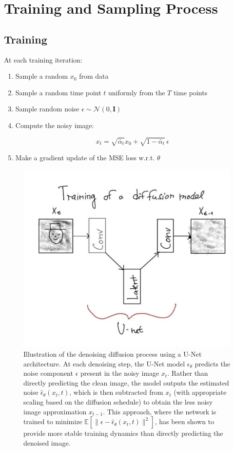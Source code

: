 \section{Training and Sampling Process}


\subsection*{Training}
At each training iteration:
\begin{enumerate}
    \item Sample a random $x_0$ from data
    \item Sample a random time point $t$ uniformly from the $T$ time points
    \item Sample random noise $\epsilon \sim \mathcal{N}(0, \mathbf{I})$
    \item Compute the noisy image:
\begin{definition}    \[
    x_t = \sqrt{\bar{\alpha}_t} x_0 + \sqrt{1 - \bar{\alpha}_t} \, \epsilon
    \]\end{definition}
    \item Make a gradient update of the MSE loss w.r.t. $\theta$
\end{enumerate}
\begin{figure}[H]
    \centering
    \includegraphics[width=1\linewidth]{billede.png}
    \caption{Illustration of the denoising diffusion process using a U-Net architecture. At each denoising step, the U-Net model $\epsilon_\theta$ predicts the noise component $\epsilon$ present in the noisy image $x_t$. Rather than directly predicting the clean image, the model outputs the estimated noise $\hat{\epsilon}_\theta(x_t, t)$, which is then subtracted from $x_t$ (with appropriate scaling based on the diffusion schedule) to obtain the less noisy image approximation $x_{t-1}$. This approach, where the network is trained to minimize $\mathbb{E}[\|\epsilon - \hat{\epsilon}_\theta(x_t, t)\|^2]$, has been shown to provide more stable training dynamics than directly predicting the denoised image.}
    \label{fig:unet_denoising}
\end{figure}

